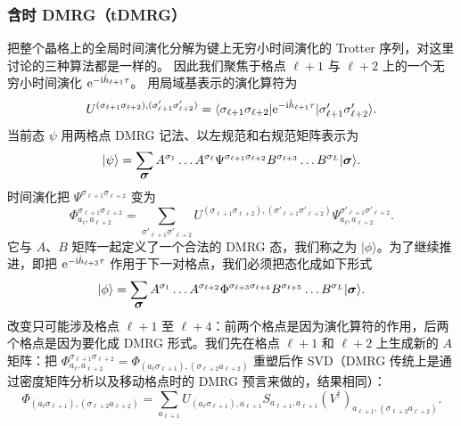 \documentclass[a4paper,10pt,oneside,onecolumn,1p,times]{elsarticle}
\newcommand{\eul}{{\rm e }}
\newcommand{\imag}{{\rm i }}
\newcommand{\bra}[1]{\mbox{$\langle #1  |$}}
\newcommand{\ket}[1]{\mbox{$| #1  \rangle$}}
\newcommand{\fat}[1]{\mbox{\boldmath$#1$\unboldmath}}	%
\begin{document}
\subsubsection{含时 DMRG（tDMRG）}
把整个晶格上的全局时间演化分解为键上无穷小时间演化的 Trotter 序列，对这里讨论的三种算法都是一样的。
因此我们聚焦于格点 $\ell+1$ 与 $\ell+2$ 上的一个无穷小时间演化 $\eul^{-\imag  \hat{h}_{\ell+1} \tau}$。 
用局域基表示的演化算符为
\begin{equation}
U^{(\sigma_{\ell+1} \sigma_{\ell+2}), (\sigma'_{\ell+1} \sigma'_{\ell+2})} = \bra{\sigma_{\ell+1} \sigma_{\ell+2}} \eul^{-\imag  \hat{h}_{\ell+1} \tau} \ket{\sigma'_{\ell+1} \sigma'_{\ell+2}} .
\end{equation}
当前态 $\psi$ 用两格点 DMRG 记法、以左规范和右规范矩阵表示为
\begin{equation}
\ket{\psi} = \sum_{\fat{\sigma}} A^{\sigma_1} \ldots A^{\sigma_\ell} \Psi^{\sigma_{\ell+1}\sigma_{\ell+2}} B^{\sigma_{\ell+3}} \ldots B^{\sigma_L} \ket{\fat{\sigma}} .
\end{equation}
时间演化把 $\Psi^{\sigma_{\ell+1}\sigma_{\ell+2}}$ 变为
\begin{equation}
\Phi^{\sigma_{\ell+1}\sigma_{\ell+2}}_{a_\ell, a_{\ell+2}} = \sum_{\sigma'_{\ell+1} \sigma'_{\ell+2}}
U^{(\sigma_{\ell+1} \sigma_{\ell+2}), (\sigma'_{\ell+1} \sigma'_{\ell+2})}  \Psi^{\sigma'_{\ell+1}\sigma'_{\ell+2}}_{a_\ell, a_{\ell+2}} . 
\end{equation} 
它与 $A$、$B$ 矩阵一起定义了一个合法的 DMRG 态，我们称之为 $\ket{\phi}$。为了继续推进，即把 $\eul^{-\imag  \hat{h}_{\ell+3} \tau}$ 作用于下一对格点，我们必须把态化成如下形式 
\begin{equation}
\ket{\phi} = \sum_{\fat{\sigma}} A^{\sigma_1} \ldots A^{\sigma_{\ell+2}} \Phi^{\sigma_{\ell+3}\sigma_{\ell+4}} B^{\sigma_{\ell+5}} \ldots B^{\sigma_L} \ket{\fat{\sigma}} .
\end{equation}
改变只可能涉及格点 $\ell+1$ 至 $\ell+4$：前两个格点是因为演化算符的作用，后两个格点是因为要化成 DMRG 形式。我们先在格点 $\ell+1$ 和 $\ell+2$ 上生成新的 $A$ 矩阵：把 $\Phi^{\sigma_{\ell+1}\sigma_{\ell+2}}_{a_\ell, a_{\ell+2}} = \Phi_{(a_\ell \sigma_{\ell+1}), (\sigma_{\ell+2} a_{\ell+2})}$ 重塑后作 SVD（DMRG 传统上是通过密度矩阵分析以及移动格点时的 DMRG 预言来做的，结果相同）：
\begin{equation}
\Phi_{(a_\ell \sigma_{\ell+1}),(\sigma_{\ell+2} a_{\ell+2})} = \sum_{a_{\ell+1}} U_{(a_\ell \sigma_{\ell+1}),a_{\ell+1}} S_{a_{\ell+1},a_{\ell+1}} (V^\dagger)_{a_{\ell+1}, (\sigma_{\ell+2} a_{\ell+2})}.
\end{equation}
\end{document}
